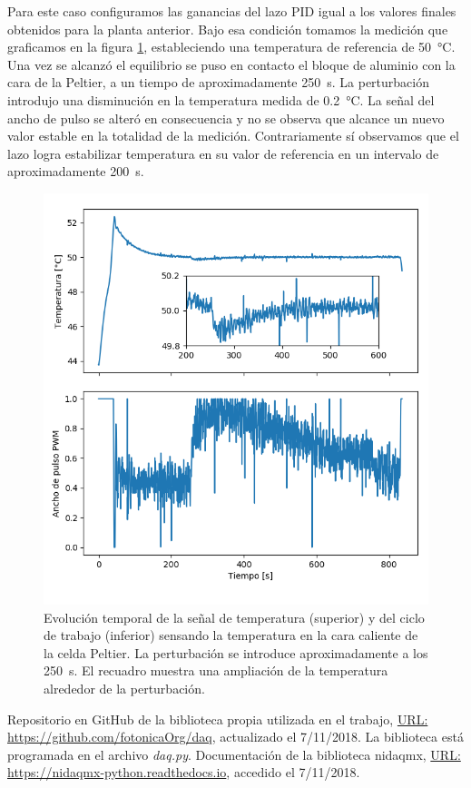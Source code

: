 \documentclass[a4paper,11pt]{article}
\begin{document}
Para este caso configuramos las ganancias del lazo PID igual a los valores finales obtenidos para la planta anterior. Bajo esa condición tomamos la medición que graficamos en la figura \ref{fig:PID_temp_peltier}, estableciendo una temperatura de referencia de \SI{50}{\celsius}. Una vez se alcanzó el equilibrio se puso en contacto el bloque de aluminio con la cara de la Peltier, a un tiempo de aproximadamente \SI{250}{\s}. La perturbación introdujo una disminución en la temperatura medida de \SI{0.2}{\celsius}. La señal del ancho de pulso se alteró en consecuencia y no se observa que alcance un nuevo valor estable en la totalidad de la medición. Contrariamente sí observamos que el lazo logra estabilizar temperatura en su valor de referencia en un intervalo de aproximadamente \SI{200}{\s}.

\begin{figure}[H]
\centering
\includegraphics[width=\textwidth]{figs/PID_sobre_peltier.png}
\caption{Evolución temporal de la señal de temperatura (superior) y del ciclo de trabajo (inferior) sensando la temperatura en la cara caliente de la celda Peltier. La perturbación se introduce aproximadamente a los \SI{250}{\s}. El recuadro muestra una ampliación de la temperatura alrededor de la perturbación.}
\label{fig:PID_temp_peltier}
\end{figure}


\begin{thebibliography}{99}

	 Repositorio en GitHub de la biblioteca propia utilizada en el trabajo, \href{https://github.com/fotonicaOrg/daq}{URL: https://github.com/fotonicaOrg/daq}, actualizado el 7/11/2018. La biblioteca está programada en el archivo \emph{daq.py}.
	 Documentación de la biblioteca nidaqmx, \href{https://nidaqmx-python.readthedocs.io}{URL: https://nidaqmx-python.readthedocs.io}, accedido el 7/11/2018.


\end{thebibliography}
\end{document}
